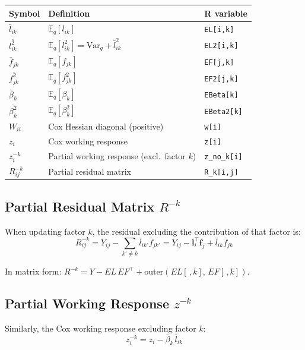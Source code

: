 \documentclass[11pt]{article}
\newcommand{\lbar}[2]{\bar{l}_{#1#2}}
\newcommand{\fbar}[2]{\bar{f}_{#1#2}}
\newcommand{\betabar}[1]{\bar{\beta}_{#1}}
\newcommand{\lsec}[2]{\overline{l^2_{#1#2}}}
\newcommand{\fsec}[2]{\overline{f^2_{#1#2}}}
\newcommand{\betasec}[1]{\overline{\beta^2_{#1}}}
\newcommand{\Rk}[0]{R^{-k}}
\newcommand{\zk}[0]{z^{-k}}
\begin{document}
\begin{center}
\begin{tabular}{lll}
\toprule
\textbf{Symbol} & \textbf{Definition} & \textbf{R variable} \\
\midrule
$\lbar{i}{k}$ & $\mathbb{E}_q[l_{ik}]$ & \texttt{EL[i,k]} \\
$\lsec{i}{k}$ & $\mathbb{E}_q[l_{ik}^2] = \mathrm{Var}_q + \bar{l}_{ik}^2$ & \texttt{EL2[i,k]} \\
$\fbar{j}{k}$ & $\mathbb{E}_q[f_{jk}]$ & \texttt{EF[j,k]} \\
$\fsec{j}{k}$ & $\mathbb{E}_q[f_{jk}^2]$ & \texttt{EF2[j,k]} \\
$\betabar{k}$ & $\mathbb{E}_q[\beta_k]$ & \texttt{EBeta[k]} \\
$\betasec{k}$ & $\mathbb{E}_q[\beta_k^2]$ & \texttt{EBeta2[k]} \\
$W_{ii}$ & Cox Hessian diagonal (positive) & \texttt{w[i]} \\
$z_i$ & Cox working response & \texttt{z[i]} \\
$\zk_i$ & Partial working response (excl.\ factor $k$) & \texttt{z\_no\_k[i]} \\
$\Rk_{ij}$ & Partial residual matrix & \texttt{R\_k[i,j]} \\
\bottomrule
\end{tabular}
\end{center}

\subsection{Partial Residual Matrix $\Rk$}

When updating factor $k$, the residual excluding the contribution of that
factor is:
\begin{equation}
  \Rk_{ij} = Y_{ij} - \sum_{k'\neq k} \lbar{i}{k'}\fbar{j}{k'}
           = Y_{ij} - \bm{l}_i^\top\bm{f}_j + \lbar{i}{k}\fbar{j}{k}
  \label{eq:Rk}
\end{equation}

In matrix form: $\Rk = Y - EL\,EF^\top + \text{outer}(EL[\,,k],\, EF[\,,k])$.

\subsection{Partial Working Response $\zk$}

Similarly, the Cox working response excluding factor $k$:
\begin{equation}
  \zk_i = z_i - \betabar{k}\,\lbar{i}{k}
  \label{eq:zk}
\end{equation}
\end{document}
